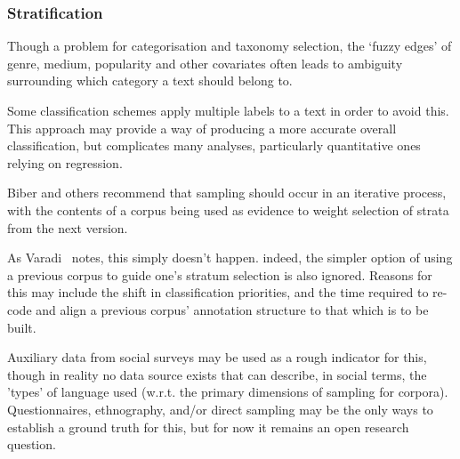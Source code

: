 \subsubsection{Stratification}
Though a problem for categorisation and taxonomy selection, the `fuzzy edges' of genre, medium, popularity and other covariates often leads to ambiguity surrounding which category a text should belong to.

Some classification schemes apply multiple labels to a text in order to avoid this\cite{sharoffs2015}.  This approach may provide a way of producing a more accurate overall classification, but complicates many analyses, particularly quantitative ones relying on regression.

Biber and others\cite{leech2006new,biber1993representativeness} recommend that sampling should occur in an iterative process, with the contents of a corpus being used as evidence to weight selection of strata from the next version.

As Varadi~\cite{varadi2000corpus}\cite{varadi2001linguistic} notes, this simply doesn't happen.  indeed, the simpler option of using a previous corpus to guide one's stratum selection is also ignored.  Reasons for this may include the shift in classification priorities, and the time required to re-code and align a previous corpus' annotation structure to that which is to be built. 



Auxiliary data from social surveys may be used as a rough indicator for this, though in reality no data source exists that can describe, in social terms, the 'types' of language used (w.r.t. the primary dimensions of sampling for corpora).  Questionnaires, ethnography, and/or direct sampling may be the only ways to establish a ground truth for this, but for now it remains an open research question.%






